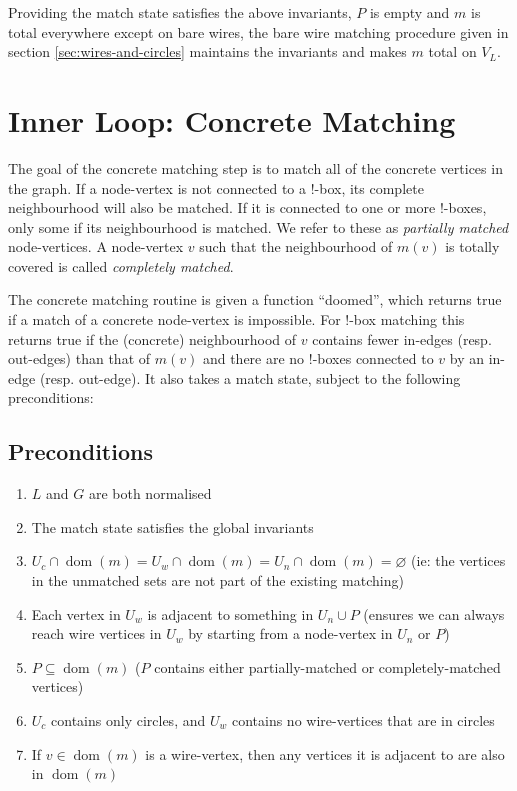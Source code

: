 \documentclass{article}
\DeclareMathOperator{\dom}{dom}
\begin{document}
Providing the match state satisfies the above invariants, $P$ is empty and $m$ is total everywhere except on bare wires, the bare wire matching procedure given in section \ref{sec:wires-and-circles} maintains the invariants and makes $m$ total on $V_L$.


\section{Inner Loop: Concrete Matching}
\label{sec:inner-loop}

The goal of the concrete matching step is to match all of the concrete vertices in the graph. If a node-vertex is not connected to a !-box, its complete neighbourhood will also be matched. If it is connected to one or more !-boxes, only some if its neighbourhood is matched. We refer to these as \textit{partially matched} node-vertices. A node-vertex $v$ such that the neighbourhood of $m(v)$ is totally covered is called \textit{completely matched}.

The concrete matching routine is given a function ``doomed'', which returns true if a match of a concrete node-vertex is impossible. For !-box matching this returns true if the (concrete) neighbourhood of $v$ contains fewer in-edges (resp. out-edges) than that of $m(v)$ and there are no !-boxes connected to $v$ by an in-edge (resp. out-edge). It also takes a match state, subject to the following preconditions:

\subsection{Preconditions}
\begin{enumerate}
  \renewcommand{\theenumi}{(\arabic{enumi})}
  \renewcommand{\labelenumi}{\theenumi}
  \item \label{enum:il-precond-norm} $L$ and $G$ are both normalised
  \item \label{enum:il-precond-inv} The match state satisfies the global invariants
  \item \label{enum:il-precond-unmatched} $U_c\cap\dom(m) = U_w\cap\dom(m) = U_n\cap\dom(m) = \varnothing$ (ie: the vertices in the unmatched sets are not part of the existing matching)
  \item \label{enum:il-precond-reachable} Each vertex in $U_w$ is adjacent to something in $U_n\cup P$ (ensures we can always reach wire vertices in $U_w$ by starting from a node-vertex in $U_n$ or $P$)
  \item \label{enum:il-precond-P-matched} $P \subseteq \dom(m)$ ($P$ contains either partially-matched or completely-matched vertices)
  \item \label{enum:il-precond-circles} $U_c$ contains only circles, and $U_w$ contains no wire-vertices that are in circles
  \item \label{enum:il-precond-wire-connected} If $v \in \dom(m)$ is a wire-vertex, then any vertices it is adjacent to are also in $\dom(m)$
\end{enumerate}
\end{document}
